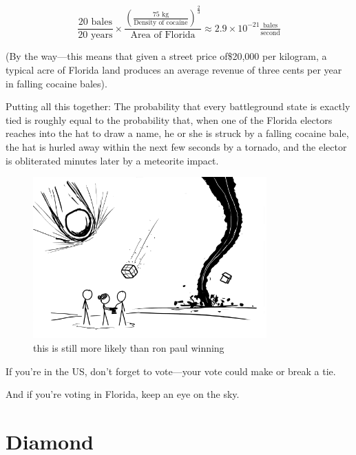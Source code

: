 {\[\frac{20\text{ bales}}{20\text{ years}}\times\frac{\left (\tfrac{75\text{ kg}}{\text{Density of cocaine}}  \right)^{\tfrac{2}{3}}}{\text{Area of Florida}}\approx2.9\times10^{-21}\tfrac{\text{bales}}{\text{second}}\]}

{
(By the way—this means that given a street price of\$20,000 per kilogram, a typical acre of Florida land produces an average revenue of three cents per year in falling cocaine bales).}

{Putting all this together: The probability that every battleground state is exactly tied is roughly equal to the probability that, when one of the Florida electors reaches into the hat to draw a name, he or she is struck by a falling cocaine bale, the hat is hurled away within the next few seconds by a tornado, and the elector is obliterated minutes later by a meteorite impact.}

\begin{figure}[!htbp]
\centering
\includegraphics[scale=0.5, max width=0.8\textwidth]{imgs/a/19/tie_catastrophe.png}
\caption{this is still more likely than ron paul winning}
\end{figure}

{If you’re in the US, don’t forget to vote—your vote could make or break a tie.}

{And if you’re voting in Florida, keep an eye on the sky.}

{
\chapter{Diamond}
}

